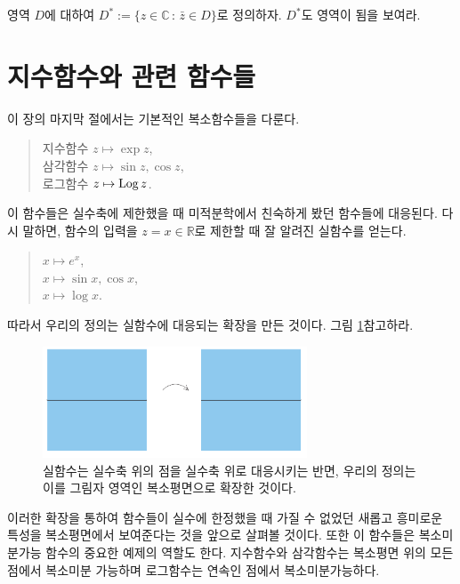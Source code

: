 \begin{salt_exercise} \label{ex-1-30}
영역 $D$에 대하여
$D^*:= \{z\in\mathbb C\,:\, \bar z \in D\}$로 정의하자.
$D^*$도 영역이 됨을 보여라.
\end{salt_exercise}

\section{지수함수와 관련 함수들}

이 장의 마지막 절에서는 기본적인 복소함수들을 다룬다.
\begin{quote}
지수함수 $z\mapsto \exp z$, \\[1ex]
삼각함수 $z\mapsto \sin z, \cos z$, \\[1ex]
로그함수  $z\mapsto \mathop{\mathrm{Log}} z$.
\end{quote}

이 함수들은 실수축에 제한했을 때
미적분학에서 친숙하게 봤던 함수들에 대응된다.
다시 말하면, 
함수의 입력을 $z=x\in\mathbb R$로 제한할 때
잘 알려진 실함수를 얻는다.
\begin{quote}
$x\mapsto e^x$, \\[1ex]
$x\mapsto \sin x, \cos x$, \\[1ex]
$x\mapsto \log x$.
\end{quote}

따라서 우리의 정의는 실함수에 대응되는 확장을 만든 것이다.
그림 \ref{fig-1-13}\을 참고하라.

\begin{figure}[!h]
\begin{center}
\includegraphics[width=0.7\textwidth]{./SaltChapter/figs/fig-1-13}
\end{center}
\caption{실함수는 실수축 위의 점을 실수축 위로 대응시키는 반면,
우리의 정의는 이를 그림자 영역인 복소평면으로 확장한 것이다.}
\label{fig-1-13}
\end{figure}

이러한 확장을 통하여
함수들이 실수에 한정했을 때 가질 수 없었던 
새롭고 흥미로운 특성을 복소평면에서 보여준다는 것을 앞으로 살펴볼 것이다.
또한 이 함수들은 복소미분가능 함수의 중요한 예제의 역할도 한다.
지수함수와 삼각함수는 복소평면 위의 모든 점에서 복소미분 가능하며
로그함수는 연속인 점에서 복소미분가능하다.

